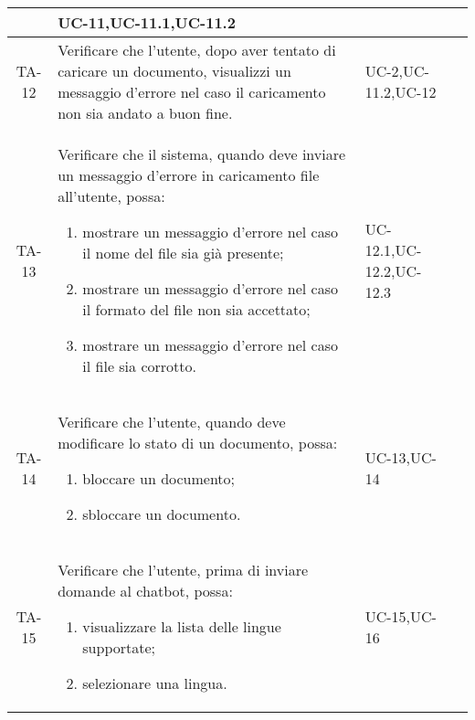 \begin{xltabular}{\textwidth}{| c | X | X | c |}
\begin{enumerate}
    \end{enumerate}& UC-11,\newline UC-11.1,\newline UC-11.2 & \textcolor{xmarkcolor}{} \\
    \hline
    TA-12 & Verificare che l’utente, dopo aver tentato di caricare un documento, visualizzi un messaggio d'errore nel caso il caricamento non sia andato a buon fine.
        & UC-2,\newline UC-11.2,\newline UC-12 & \textcolor{xmarkcolor}{} \\
    \hline
     TA-13 & Verificare che il sistema, quando deve inviare un messaggio d'errore in caricamento file all'utente, possa:
    \begin{enumerate}
        \item mostrare un messaggio d'errore nel caso il nome del file sia già presente;
        \item mostrare un messaggio d'errore nel caso il formato del file non sia accettato;
        \item mostrare un messaggio d'errore nel caso il file sia corrotto.
        
    \end{enumerate}& UC-12.1,\newline UC-12.2,\newline UC-12.3 & \textcolor{xmarkcolor}{} \\
    \hline

    TA-14 & Verificare che l’utente, quando deve modificare lo stato di un documento, possa:
    \begin{enumerate}
        \item bloccare un documento;
        \item sbloccare un documento.
        
    \end{enumerate}& UC-13,\newline UC-14 & \textcolor{xmarkcolor}{} \\
    \hline
    
    TA-15 & Verificare che l’utente, prima di inviare domande al chatbot, possa:
    \begin{enumerate}
        \item visualizzare la lista delle lingue supportate;
        \item selezionare una lingua.
        
    \end{enumerate}& UC-15,\newline UC-16 & \textcolor{xmarkcolor}{} \\
    \hline


\end{xltabular}
